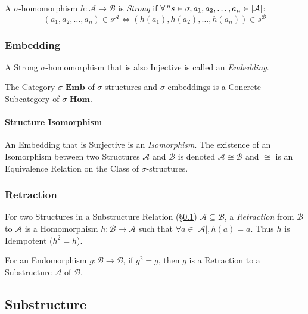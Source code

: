 A $\sigma$-homomorphism $h : \mathcal{A} \rightarrow \mathcal{B}$ is
\emph{Strong} if $\forall \prescript{n}{}{s} \in \sigma, a_1,
a_2,\ldots, a_n \in |\mathcal{A}|$:
\[
    (a_1, a_2,\ldots, a_n) \in s^\mathcal{A} \Leftrightarrow
    (h(a_1), h(a_2),\ldots,h(a_n)) \in s^\mathcal{B}
\]



\subsubsection{Embedding}\label{sec:embedding}

A Strong $\sigma$-homomorphism that is also Injective is called an
\emph{Embedding}.

The Category $\sigma$-$\mathbf{Emb}$ of $\sigma$-structures and
$\sigma$-embeddings is a Concrete Subcategory of
$\sigma$-$\mathbf{Hom}$.



\paragraph{Structure Isomorphism}\label{sec:structure_isomorphism}

An Embedding that is Surjective is an \emph{Isomorphism}. The
existence of an Isomorphism between two Structures $\mathcal{A}$ and
$\mathcal{B}$ is denoted $\mathcal{A} \cong \mathcal{B}$ and $\cong$
is an Equivalence Relation on the Class of $\sigma$-structures.



\subsubsection{Retraction}\label{sec:retraction}

For two Structures in a Substructure Relation
(\S\ref{sec:substructure}) $\mathcal{A} \subseteq \mathcal{B}$, a
\emph{Retraction} from $\mathcal{B}$ to $\mathcal{A}$ is a
Homomorphism $h : \mathcal{B} \rightarrow \mathcal{A}$ such that
$\forall a \in |\mathcal{A}|, h(a) = a$. Thus $h$ is Idempotent ($h^2
= h$).

For an Endomorphism $g : \mathcal{B} \rightarrow \mathcal{B}$, if $g^2
= g$, then $g$ is a Retraction to a Substructure $\mathcal{A}$ of
$\mathcal{B}$.



\subsection{Substructure}\label{sec:substructure}


